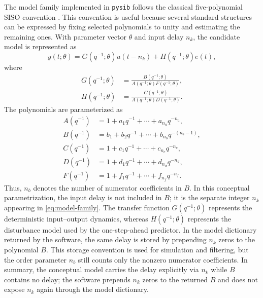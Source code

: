 \documentclass{ifacconf}
\begin{document}
The model family implemented in \texttt{pysib} follows the classical
five-polynomial SISO convention \citep{ljung1999,soderstrom1989}.  This
convention is useful because several standard structures can be expressed by
fixing selected polynomials to unity and estimating the remaining ones.  With
parameter vector \(\theta\) and input delay \(n_k\), the candidate model is
represented as
\begin{equation}
  y(t;\theta) = G(q^{-1};\theta)u(t-n_k)
  + H(q^{-1};\theta)e(t),
  \label{eq:model-family}
\end{equation}
where
\begin{align}
  G(q^{-1};\theta)
  &= \frac{B(q^{-1};\theta)}{A(q^{-1};\theta)F(q^{-1};\theta)}, \\
  H(q^{-1};\theta)
  &= \frac{C(q^{-1};\theta)}{A(q^{-1};\theta)D(q^{-1};\theta)}.
  \label{eq:gh}
\end{align}
The polynomials are parameterized as
\begin{align}
  A(q^{-1}) &= 1+a_1q^{-1}+\cdots+a_{n_a}q^{-n_a}, \\
  B(q^{-1}) &= b_1+b_2q^{-1}+\cdots+b_{n_b}q^{-(n_b-1)}, \\
  C(q^{-1}) &= 1+c_1q^{-1}+\cdots+c_{n_c}q^{-n_c}, \\
  D(q^{-1}) &= 1+d_1q^{-1}+\cdots+d_{n_d}q^{-n_d}, \\
  F(q^{-1}) &= 1+f_1q^{-1}+\cdots+f_{n_f}q^{-n_f}.
  \label{eq:polynomial-parametrization}
\end{align}
Thus, \(n_b\) denotes the number of numerator coefficients in \(B\).  In this
conceptual parametrization, the input delay is not included in \(B\); it is the
separate integer \(n_k\) appearing in \eqref{eq:model-family}.
The transfer function \(G(q^{-1};\theta)\) represents the deterministic
input--output dynamics, whereas \(H(q^{-1};\theta)\) represents the disturbance
model used by the one-step-ahead predictor.  In the model dictionary returned by
the software, the same delay is stored by prepending \(n_k\) zeros to the
polynomial \(B\).  This storage convention is used for simulation and filtering,
but the order parameter \(n_b\) still counts only the nonzero numerator
coefficients.  In summary, the conceptual model carries the delay explicitly via
\(n_k\) while \(B\) contains no delay; the software prepends \(n_k\) zeros to the
returned \(B\) and does not expose \(n_k\) again through the model dictionary.
\end{document}
